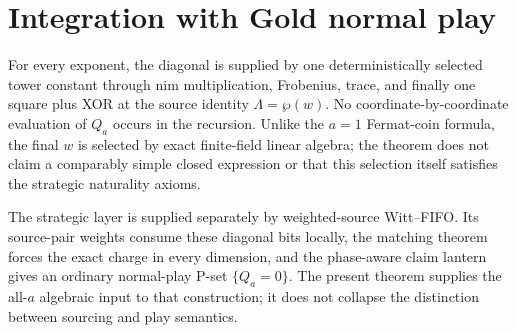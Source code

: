\documentclass[11pt]{article}
\theoremstyle{remark}
\newcommand{\AS}{\wp}
\newcommand{\Lam}{\Lambda}
\begin{document}
\section{Integration with Gold normal play}

For every exponent, the diagonal is supplied by one deterministically selected tower
constant through nim multiplication, Frobenius, trace, and finally one square
plus XOR at the source identity $\Lam=\AS(w)$. No coordinate-by-coordinate
evaluation of $Q_a$ occurs in the recursion. Unlike the $a=1$ Fermat-coin
formula, the final $w$ is selected by exact finite-field linear algebra; the
theorem does not claim a comparably simple closed expression or that this
selection itself satisfies the strategic naturality axioms.

The strategic layer is supplied separately by weighted-source Witt--FIFO. Its
source-pair weights consume these diagonal bits locally, the matching theorem
forces the exact charge in every dimension, and the phase-aware claim lantern
gives an ordinary normal-play P-set $\{Q_a=0\}$. The present theorem supplies
the all-$a$ algebraic input to that construction; it does not collapse the
distinction between sourcing and play semantics.
\end{document}
